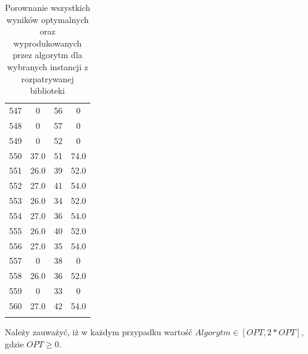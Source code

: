 \documentclass[12pt, a4paper]{report}
\begin{document}
\begin{longtable}{| c | c | c | c |}
  547 & 0 & 56 & 0 \\
  548 & 0 & 57 & 0 \\
  549 & 0 & 52 & 0 \\
  550 & 37.0 & 51 & 74.0 \\
  551 & 26.0 & 39 & 52.0 \\
  552 & 27.0 & 41 & 54.0 \\
  553 & 26.0 & 34 & 52.0 \\
  554 & 27.0 & 36 & 54.0 \\
  555 & 26.0 & 40 & 52.0 \\
  556 & 27.0 & 35 & 54.0 \\
  557 & 0 & 38 & 0 \\
  558 & 26.0 & 36 & 52.0 \\
  559 & 0 & 33 & 0 \\
  560 & 27.0 & 42 & 54.0 \\  
  \hline
  \caption{Porownanie wszystkich wyników optymalnych oraz wyprodukowanych przez algorytm dla wybranych instancji z rozpatrywanej biblioteki}
\end{longtable}
  Należy zauważyć, iż w każdym przypadku wartość $Algorytm \in [OPT,2*OPT]$, gdzie $OPT \geq 0$.





  \clearpage
  
  
\end{document}
